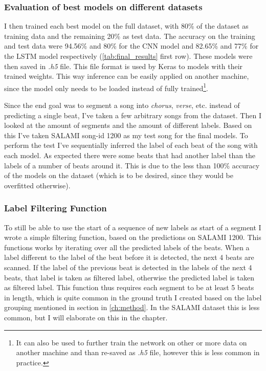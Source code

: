 \subsubsection{Evaluation of best models on different datasets}

I then trained each best model on the full dataset, with 80\% of the dataset as training data and the remaining 20\% as test data. The accuracy on the training and test data were 94.56\% and 80\% for the CNN model and 82.65\% and 77\% for the LSTM model respectively (\autoref{tab:final_results} first row). These models were then saved in \textit{.h5} file. This file format is used by Keras to models with their trained weights. This way inference can be easily applied on another machine, since the model only needs to be loaded instead of fully trained\footnote{It can also be used to further train the network on other or more data on another machine and than re-saved as \textit{.h5} file, however this is less common in practice.}.

Since the end goal was to segment a song into \textit{chorus}, \textit{verse}, etc. instead of predicting a single beat, I've taken a few arbitrary songs from the dataset. Then I looked at the amount of segments and the amount of different labels. Based on this I've taken SALAMI song-id 1200 as my test song for the final models. To perform the test I've sequentially inferred the label of each beat of the song with each model. As expected there were some beats that had another label than the labels of a number of beats around it. This is due to the less than 100\% accuracy of the models on the dataset (which is to be desired, since they would be overfitted otherwise). 

\subsubsection{Label Filtering Function}


To still be able to use the start of a sequence of new labels as start of a segment I wrote a simple filtering function, based on the predictions on SALAMI 1200. This functions works by iterating over all the predicted labels of the beats. When a label different to the label of the beat before it is detected, the next 4 beats are scanned. If the label of the previous beat is detected in the labels of the next 4 beats, that label is taken as filtered label, otherwise the predicted label is taken as filtered label. This function thus requires each segment to be at least 5 beats in length, which is quite common in the ground truth I created based on the label grouping mentioned in  section in \autoref{ch:method}. In the SALAMI dataset this is less common, but I will elaborate on this in the  chapter.

